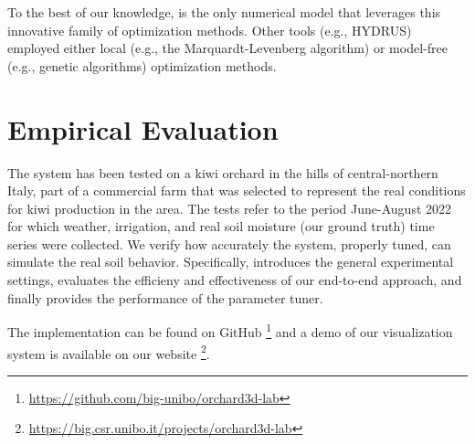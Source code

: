 To the best of our knowledge, \olab{} is the only numerical model that leverages this innovative family of optimization methods.
Other tools (e.g., HYDRUS) employed either local (e.g., the Marquardt-Levenberg algorithm) or model-free (e.g., genetic algorithms) optimization methods. 

\section{Empirical Evaluation}
The system has been tested on a kiwi orchard in the hills of central-northern Italy, part of a commercial farm that was selected to represent the real conditions for kiwi production in the area.
The tests refer to the period June-August 2022 for which weather, irrigation, and real soil moisture (our ground truth) time series were collected.
We verify how accurately the system, properly tuned, can simulate the real soil behavior.
Specifically,  introduces the general experimental settings,  evaluates the efficieny and effectiveness of our end-to-end approach, and finally  provides the performance of the parameter tuner.

The implementation can be found on GitHub \footnote{\url{https://github.com/big-unibo/orchard3d-lab}} and a demo of our \olab{} visualization system is available on our website \footnote{\url{https://big.csr.unibo.it/projects/orchard3d-lab}}.

